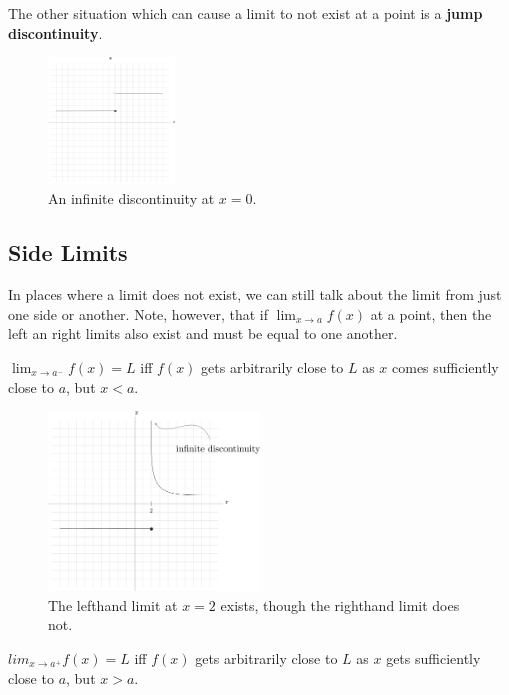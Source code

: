 The other situation which can cause a limit to not exist at a point is a \textbf{jump discontinuity}.
\begin{figure}[H]
  \begin{center}
    \includegraphics[width=0.3\textwidth]{continuous/limits/jumps.eps}
  \end{center}
  \caption{An infinite discontinuity at $x=0$.}
\end{figure}
\subsection{Side Limits}

In places where a limit does not exist, we can still talk about the limit from just one side or another.
Note, however, that if $\lim_{x\to a}f(x)$ at a point, then the left an right limits also exist and must be equal to one another.

\begin{theorem}
  \( \lim_{x\to a^-} f(x)=L \) iff \(f(x)\) gets arbitrarily close to \(L\) as \(x\) comes sufficiently close to \(a\), but \(x < a \).
  \label{theorem:lefthandlimit}
\end{theorem}
\begin{figure}[H]
  \begin{center}
    \includegraphics[width=0.5\textwidth]{continuous/limits/llmt.eps}
  \end{center}
  \caption{The lefthand limit at $x=2$ exists, though the righthand limit does not.}
\end{figure}
\begin{theorem}
  \( lim_{x \to a^+} f(x)=L \) iff \(f(x)\) gets arbitrarily close to \(L\) as \(x\) gets sufficiently close to \(a\), but \(x > a\).
  \label{}
\end{theorem}

